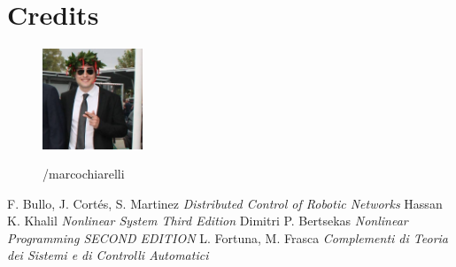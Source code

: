 \documentclass[11 pt,a4paper,twoside,openany]{book}
\begin{document}








\backmatter
% 

\newpage

\section*{Credits}

\begin{figure}[h]
\includegraphics[width=3cm]{figures/marco.jpg}
\vspace{0.3cm}

%
\hspace{0.05cm} /marcochiarelli

\end{figure}



\begin{thebibliography}{100}
 F. Bullo, J. Cortés, S. Martinez \emph{Distributed Control of Robotic Networks}
 Hassan K. Khalil \emph{Nonlinear System Third Edition}
 Dimitri P. Bertsekas \emph{Nonlinear Programming SECOND EDITION}
 L. Fortuna, M. Frasca \emph{Complementi di Teoria dei Sistemi e di Controlli Automatici}
\end{thebibliography}
\end{document}
